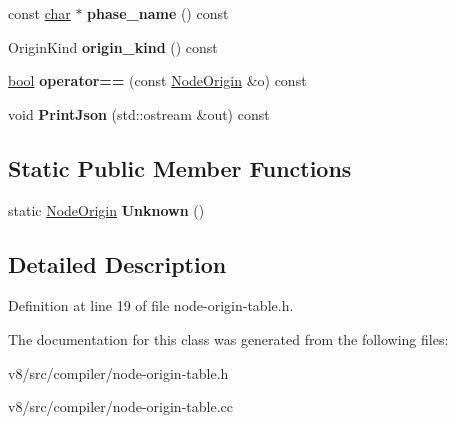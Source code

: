 \begin{DoxyCompactItemize}
const \mbox{\hyperlink{classchar}{char}} $\ast$ {\bfseries phase\+\_\+name} () const
\item 
\mbox{\label{classv8_1_1internal_1_1compiler_1_1NodeOrigin_aea5fad4e838435cc24a10c13b1ada1a8}} 
Origin\+Kind {\bfseries origin\+\_\+kind} () const
\item 
\mbox{\label{classv8_1_1internal_1_1compiler_1_1NodeOrigin_a8206c48dd6077ae7b2ec8191bc0c1f97}} 
\mbox{\hyperlink{classbool}{bool}} {\bfseries operator==} (const \mbox{\hyperlink{classv8_1_1internal_1_1compiler_1_1NodeOrigin}{Node\+Origin}} \&o) const
\item 
\mbox{\label{classv8_1_1internal_1_1compiler_1_1NodeOrigin_a6885d9de2b213d86c8e7085a62a950b7}} 
void {\bfseries Print\+Json} (std\+::ostream \&out) const
\end{DoxyCompactItemize}
\subsection*{Static Public Member Functions}
\begin{DoxyCompactItemize}
\item 
\mbox{\label{classv8_1_1internal_1_1compiler_1_1NodeOrigin_ae99e235ec0c1337b2718f24ec3b62623}} 
static \mbox{\hyperlink{classv8_1_1internal_1_1compiler_1_1NodeOrigin}{Node\+Origin}} {\bfseries Unknown} ()
\end{DoxyCompactItemize}


\subsection{Detailed Description}


Definition at line 19 of file node-\/origin-\/table.\+h.



The documentation for this class was generated from the following files\+:\begin{DoxyCompactItemize}
\item 
v8/src/compiler/node-\/origin-\/table.\+h\item 
v8/src/compiler/node-\/origin-\/table.\+cc\end{DoxyCompactItemize}
